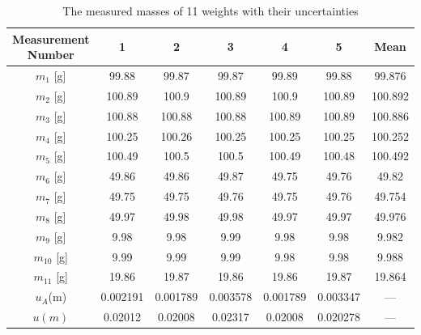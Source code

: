\documentclass[a4paper,12pt,titlepage,bibliography=numbered]{article}
\begin{document}
\begin{table}[H]
\centering
\caption{The measured masses of 11 weights with their uncertainties} \label{table_with_weights}
\begin{tabular}{|c|c|c|c|c|c|c|}
\hline
Measurement Number & 1 & 2 & 3 & 4 & 5 & Mean \\ 
\hline
$m_1$ [g] & 99.88 & 99.87 & 99.87 & 99.89 & 99.88 & 99.876 \\ 
\hline
$m_2$ [g] & 100.89 & 100.9 & 100.89 & 100.9 & 100.89 & 100.892 \\ 
\hline
$m_3$ [g] & 100.88 & 100.88 & 100.88 & 100.89 & 100.89 & 100.886 \\ 
\hline
$m_4$ [g] & 100.25 & 100.26 & 100.25 & 100.25 & 100.25 & 100.252 \\ 
\hline
$m_5$ [g] & 100.49 & 100.5 & 100.5 & 100.49 & 100.48 & 100.492 \\ 
\hline
$m_6$ [g] & 49.86 & 49.86 & 49.87 & 49.75 & 49.76 & 49.82 \\
\hline
$m_7$ [g] & 49.75 & 49.75 & 49.76 & 49.75 & 49.76 & 49.754 \\ 
\hline
$m_8$ [g] & 49.97 & 49.98 & 49.98 & 49.97 & 49.97 & 49.976 \\ 
\hline
$m_9$ [g] & 9.98 & 9.98 & 9.99 & 9.98 & 9.98 & 9.982 \\
\hline
$m_{10}$ [g] & 9.99 & 9.99 & 9.99 & 9.98 & 9.98 & 9.988 \\ 
\hline
$m_{11}$ [g] & 19.86 & 19.87 & 19.86 & 19.86 & 19.87 & 19.864 \\ 
\hline
$u_A$(m) & 0.002191 & 0.001789 & 0.003578 & 0.001789 & 0.003347 & --- \\ 
\hline
$u(m)$ & 0.02012 & 0.02008 & 0.02317 & 0.02008 & 0.020278 & --- \\ 
\hline
\end{tabular}
\end{table}
\end{document}
